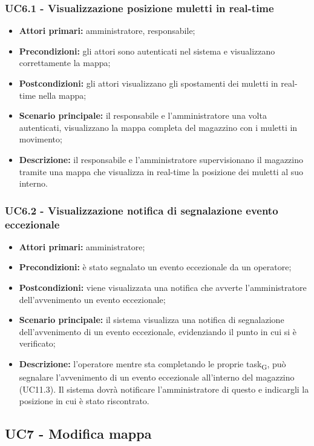 \subsubsection{UC6.1 - Visualizzazione posizione muletti in real-time}
\begin{itemize}
	\item 	\textbf{Attori primari:} amministratore, responsabile;
	\item 	\textbf{Precondizioni:} gli attori sono autenticati nel sistema e visualizzano correttamente la mappa;
	\item 	\textbf{Postcondizioni:} gli attori visualizzano gli spostamenti dei muletti in real-time nella mappa;
	\item 	\textbf{Scenario principale:} il responsabile e l'amministratore una volta autenticati, visualizzano la mappa completa del magazzino con i muletti in movimento;
	\item 	\textbf{Descrizione:} il responsabile e l'amministratore supervisionano il magazzino tramite una mappa che visualizza in real-time la posizione dei muletti al suo interno.
\end{itemize}

\subsubsection{UC6.2 - Visualizzazione notifica di segnalazione evento eccezionale}
\begin{itemize}
	\item 	\textbf{Attori primari:} amministratore;
	\item 	\textbf{Precondizioni:} è stato segnalato un evento eccezionale da un operatore;
	\item 	\textbf{Postcondizioni:} viene visualizzata una notifica che avverte l'amministratore dell'avvenimento un evento eccezionale;
	\item 	\textbf{Scenario principale:} il sistema visualizza una notifica di segnalazione dell'avvenimento di un evento eccezionale, evidenziando il punto in cui si è verificato;
	\item 	\textbf{Descrizione:} l'operatore mentre sta completando le proprie task\textsubscript{G}, può segnalare l'avvenimento di un evento eccezionale all'interno del magazzino (UC11.3). Il sistema dovrà notificare l'amministratore di questo e indicargli la posizione in cui è stato riscontrato.
\end{itemize}

\subsection{UC7 - Modifica mappa}



